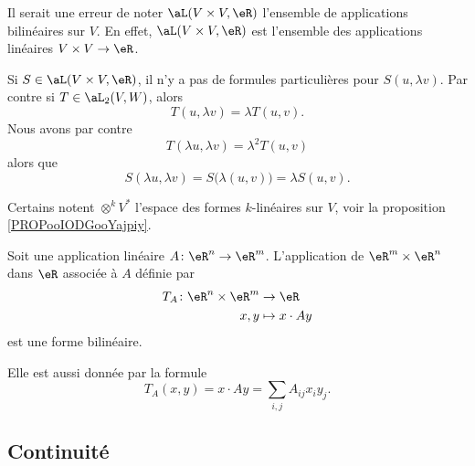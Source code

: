 \begin{normaltext}
	Il serait une erreur de noter \( \aL(V\times V,\eR)\) l'ensemble de applications bilinéaires sur \( V\). En effet, \( \aL(V\times V,\eR)\) est l'ensemble des applications linéaires \( V\times V\to \eR\).

	Si \( S\in \aL(V\times V,\eR)\), il n'y a pas de formules particulières pour \( S(u,\lambda v)\). Par contre si \( T\in\aL_2(V,W)\), alors
	\begin{equation}
		T(u,\lambda v)=\lambda T(u,v).
	\end{equation}
	Nous avons par contre
	\begin{equation}
		T(\lambda u,\lambda v)=\lambda^2 T(u,v)
	\end{equation}
	alors que
	\begin{equation}
		S(\lambda u,\lambda v)=  S\big( \lambda(u,v) \big) =\lambda S(u,v).
	\end{equation}

	Certains\cite{BIBooDEEYooRGFyDD} notent \( \otimes^kV^*\) l'espace des formes \( k\)-linéaires sur \( V\), voir la proposition \ref{PROPooIODGooYajpiy}.
\end{normaltext}


\begin{example}
	Soit une application linéaire \(A \colon \eR^n\to \eR^m  \). L'application de \( \eR^m\times \eR^n\) dans \( \eR\) associée à \( A\) définie par
	\begin{equation}
		\begin{aligned}
			T_A\colon \eR^n\times \eR^m & \to \eR           \\
			x,y                         & \mapsto x\cdot Ay
		\end{aligned}
	\end{equation}
	est une forme bilinéaire.

	Elle est aussi donnée par la formule
	\begin{equation}
		T_A(x,y)= x\cdot Ay =\sum_{i,j}A_{ij}x_i y_j.
	\end{equation}
\end{example}

\subsection{Continuité}


